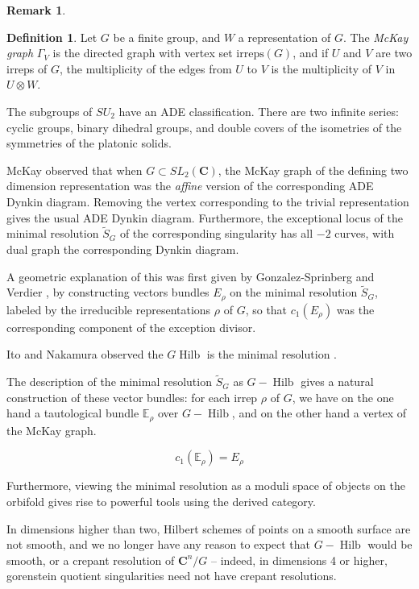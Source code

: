 \documentclass{amsart}[12pt]
\theoremstyle{definition}
\newtheorem{definition}[dummy]{Definition}
\newtheorem{remark}[dummy]{Remark}
\newcommand{\C}{\mathbf{C}}
\newcommand{\irreps}{\text{irreps}}
\DeclareMathOperator{\Hilb}{Hilb}
\begin{document}
\begin{remark}
\begin{definition}
Let $G$ be a finite group, and $W$ a representation of $G$.  The \emph{McKay graph} $\Gamma_V$ is the directed graph with vertex set $\irreps(G)$, and if $U$ and $V$ are two irreps of $G$, the multiplicity of the edges from $U$ to $V$ is the multiplicity of $V$ in $U\otimes W$.
\end{definition}

The subgroups of $SU_2$ have an ADE classification.  There are two infinite series: cyclic groups, binary dihedral groups, and double covers of the isometries of the symmetries of the platonic solids.

McKay observed \cite{McKay} that when $G\subset SL_2(\C)$, the McKay graph of the defining two dimension representation was the \emph{affine} version of the corresponding ADE Dynkin diagram.  Removing the vertex corresponding to the trivial representation gives the usual ADE Dynkin diagram.  Furthermore, the exceptional locus of the minimal resolution $\widetilde{S}_G$ of the corresponding singularity has all $-2$ curves, with dual graph the corresponding Dynkin diagram. 






A geometric explanation of this was first given by Gonzalez-Sprinberg and Verdier \cite{GSV}, by constructing vectors bundles $E_\rho$ on the minimal resolution $\widetilde{S}_G$, labeled by the irreducible representations $\rho$ of $G$, so that $c_1(E_\rho)$ was the corresponding component of the exception divisor.

Ito and Nakamura observed the $G\Hilb$ is the minimal resolution \cite{IN}.

The description of the minimal resolution $\widetilde{S}_G$ as $G-\Hilb$ gives a natural construction of these vector bundles: for each irrep $\rho$ of $G$, we have on the one hand a tautological bundle $\mathbb{E}_\rho$ over $G-\Hilb$, and on the other hand a vertex of the McKay graph.  

$$c_1(\mathbb{E}_\rho)=E_\rho$$

Furthermore, viewing the minimal resolution as a moduli space of objects on the orbifold gives rise to powerful tools using the derived category.  

In dimensions higher than two, Hilbert schemes of points on a smooth surface are not smooth, and we no longer have any reason to expect that $G-\Hilb$ would be smooth, or a crepant resolution of $\C^n/G$ -- indeed, in dimensions 4 or higher, gorenstein quotient singularities need not have crepant resolutions.


\end{remark}
\end{document}
